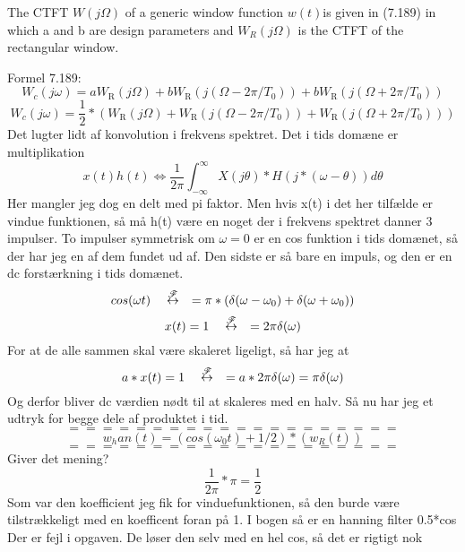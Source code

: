 \begin{Opgaver}
\begin{kapitel}
\begin{Opgave}
        \end{Opgave}
        \begin{Opgave}
            The CTFT $W(j\Omega)$ of a generic window function $w(t)$is given in (7.189) in which a
            and b are design parameters and $W_R(j\Omega)$ is the CTFT of the rectangular window.
            \begin{UnderOpgave}[For the choice of \text{$a = b = 0.5$} and using ICTFT show that the resulting Hann
                window function is given by eq. 7.190.]
                Formel 7.189: 
                \[W_c(j\omega)=a W_{\mathrm{R}}(j\Omega)+b W_{\mathrm{R}}(j(\Omega-2\pi/T_{0}))+b W_{\mathrm{R}}(j(\Omega+2\pi/T_{0}))\]
                \[W_c(j\omega)=\frac{1}{2} * (W_{\mathrm{R}}(j\Omega)+ W_{\mathrm{R}}(j(\Omega-2\pi/T_{0})) + W_{\mathrm{R}}(j(\Omega+2\pi/T_{0})))\]
                Det lugter lidt af konvolution i frekvens spektret. Det i tids domæne er multiplikation
                \[x(t)h(t) \Leftrightarrow \frac{1}{2\pi}\int_{-\infty}^{\infty}{X(j\theta) * H(j*(\omega - \theta)) d\theta}\]
                Her mangler jeg dog en delt med pi faktor. 
                Men hvis x(t) i det her tilfælde er vindue funktionen, så må h(t) være en noget der i frekvens spektret danner 3 impulser. 
                To impulser symmetrisk om $\omega = 0$ er en cos funktion i tids domænet, så der har jeg en af dem fundet ud af. Den sidste er så bare en impuls, og den er en dc forstærkning i tids domænet. 
                \[cos(\omega t) \transformation{F} = \pi*(\delta(\omega - \omega_0) + \delta(\omega + \omega_0))\]
                \[x(t) = 1 \transformation{F} = 2\pi\delta(\omega)\]
                For at de alle sammen skal være skaleret ligeligt, så har jeg at 
                \[a * x(t) = 1 \transformation{F} = a * 2\pi\delta(\omega) = \pi\delta(\omega)\]
                Og derfor bliver dc værdien nødt til at skaleres med en halv.
                Så nu har jeg et udtryk for begge dele af produktet i tid.
                \[====================\]
                \[w_han(t) = (cos(\omega_0 t) + 1/2) * (w_R(t))\]
                \[====================\]
                Giver det mening? 
                \[\frac{1}{2\pi} * \pi = \frac{1}{2}\]
                Som var den koefficient jeg fik for vinduefunktionen, så den burde være tilstrækkeligt med en koefficent foran på 1.
                I bogen så er en hanning filter 0.5*cos\\
                Der er fejl i opgaven. De løser den selv med en hel cos, så det er rigtigt nok
            \end{UnderOpgave}
            

\end{Opgave}
\end{kapitel}
\end{Opgaver}
